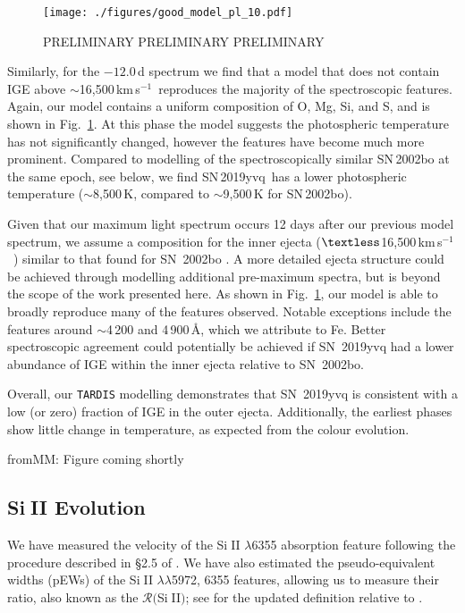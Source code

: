 \documentclass[twocolumn]{aastex63}
\def\ion#1#2{#1$\;${\footnotesize\rm{#2}}\relax}
\newcommand{\frommark}[1]{{\color{orange} fromMM: {#1}}}
\newcommand{\kms}{km\,s$^{-1}$}
\newcommand{\sn}{SN\,2019yvq}
\begin{document}
\begin{figure}
    \centering
    \texttt{[image: ./figures/good\_model\_pl\_10.pdf]}
    \caption{PRELIMINARY PRELIMINARY PRELIMINARY}
    \label{fig:tardis}
\end{figure}

Similarly, for the $-12.0$\,d spectrum we find that a model that does not
contain IGE above $\sim$16,500\,\kms\ reproduces the majority of the
spectroscopic features. Again, our model contains a uniform composition of O, Mg, Si, and S, and is shown in Fig.~\ref{fig:tardis}. At this phase the model suggests the photospheric
temperature has not significantly changed, however the features have become much more prominent. Compared to modelling of the spectroscopically similar SN\,2002bo \citep{Stehle05} at the same epoch, see below, we find \sn\ has a lower photospheric temperature ($\sim$8,500\,K, compared to $\sim$9,500\,K for SN\,2002bo).

Given that our maximum light spectrum occurs 12 days after our previous model spectrum, we assume a composition for the inner ejecta ($\textless$16,500\,\kms\ ) similar to that found for SN~2002bo \citep{Stehle05}. A more detailed ejecta structure could be achieved through modelling additional pre-maximum spectra, but is beyond the scope of the work presented here. As shown in Fig.~\ref{fig:tardis}, our model is able to broadly reproduce many of the features observed. Notable exceptions include the features around $\sim$4\,200 and 4\,900\,\AA, which we attribute to Fe. Better spectroscopic agreement could potentially be achieved if SN~2019yvq had a lower abundance of IGE within the inner ejecta relative to SN~2002bo. 

Overall, our \texttt{TARDIS} modelling demonstrates that SN~2019yvq is consistent with a low (or zero) fraction of IGE in the outer ejecta. Additionally, the earliest phases show little change in temperature, as expected from the colour evolution. 

\frommark{Figure coming shortly}

\subsection{\ion{Si}{II} Evolution}\label{sec:SiII}

We have measured the velocity of the \ion{Si}{II} $\lambda$6355 absorption
feature following the procedure described in \S2.5 of \citet{Maguire14}. We
have also estimated the pseudo-equivalent widths (pEWs) of the \ion{Si}{II}
$\lambda\lambda$5972, 6355 features, allowing us to measure their ratio, also
known as the $\mathcal{R}($\ion{Si}{II}$)$; see \citet{Hachinger08} for the
updated definition relative to \citet{Nugent95}.
\end{document}
